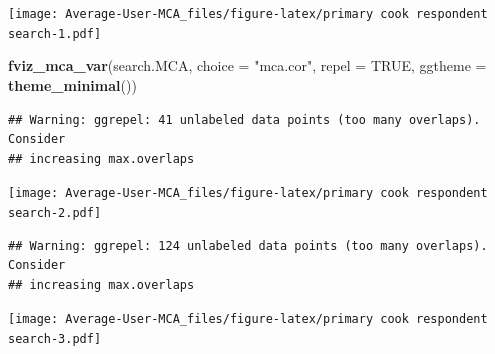 \documentclass[
]{article}
\newenvironment{Shaded}{\begin{snugshade}}{\end{snugshade}}
\newcommand{\DataTypeTok}[1]{\textcolor[rgb]{0.13,0.29,0.53}{#1}}
\newcommand{\KeywordTok}[1]{\textcolor[rgb]{0.13,0.29,0.53}{\textbf{#1}}}
\newcommand{\NormalTok}[1]{#1}
\newcommand{\OtherTok}[1]{\textcolor[rgb]{0.56,0.35,0.01}{#1}}
\newcommand{\StringTok}[1]{\textcolor[rgb]{0.31,0.60,0.02}{#1}}
\begin{document}
\texttt{[image: Average-User-MCA\_files/figure-latex/primary cook respondent search-1.pdf]}

\begin{Shaded}
\begin{Highlighting}[]
\KeywordTok{fviz_mca_var}\NormalTok{(search.MCA, }\DataTypeTok{choice =} \StringTok{"mca.cor"}\NormalTok{, }\DataTypeTok{repel =} \OtherTok{TRUE}\NormalTok{,}
             \DataTypeTok{ggtheme =} \KeywordTok{theme_minimal}\NormalTok{())}
\end{Highlighting}
\end{Shaded}

\begin{verbatim}
## Warning: ggrepel: 41 unlabeled data points (too many overlaps). Consider
## increasing max.overlaps
\end{verbatim}

\texttt{[image: Average-User-MCA\_files/figure-latex/primary cook respondent search-2.pdf]}

\begin{Shaded}
\end{Shaded}

\begin{verbatim}
## Warning: ggrepel: 124 unlabeled data points (too many overlaps). Consider
## increasing max.overlaps
\end{verbatim}

\texttt{[image: Average-User-MCA\_files/figure-latex/primary cook respondent search-3.pdf]}
\end{document}
